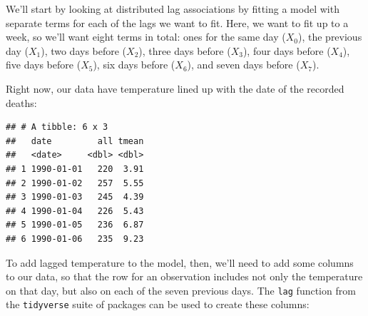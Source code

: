 \documentclass[
]{book}
\newenvironment{Shaded}{\begin{snugshade}}{\end{snugshade}}
\newcommand{\DataTypeTok}[1]{\textcolor[rgb]{0.13,0.29,0.53}{#1}}
\newcommand{\DecValTok}[1]{\textcolor[rgb]{0.00,0.00,0.81}{#1}}
\newcommand{\KeywordTok}[1]{\textcolor[rgb]{0.13,0.29,0.53}{\textbf{#1}}}
\newcommand{\NormalTok}[1]{#1}
\newcommand{\OperatorTok}[1]{\textcolor[rgb]{0.81,0.36,0.00}{\textbf{#1}}}
\newcommand{\StringTok}[1]{\textcolor[rgb]{0.31,0.60,0.02}{#1}}
\begin{document}
We'll start by looking at distributed lag associations by fitting a model with
separate terms for each of the lags we want to fit. Here, we want to fit up to
a week, so we'll want eight terms in total: ones for the same day (\(X_0\)), the
previous day (\(X_1\)), two days before (\(X_2\)), three days before (\(X_3\)),
four days before (\(X_4\)), five days before (\(X_5\)), six days before (\(X_6\)),
and seven days before (\(X_7\)).

Right now, our data have temperature lined up with the date of the recorded deaths:

\begin{Shaded}
\end{Shaded}

\begin{verbatim}
## # A tibble: 6 x 3
##   date         all tmean
##   <date>     <dbl> <dbl>
## 1 1990-01-01   220  3.91
## 2 1990-01-02   257  5.55
## 3 1990-01-03   245  4.39
## 4 1990-01-04   226  5.43
## 5 1990-01-05   236  6.87
## 6 1990-01-06   235  9.23
\end{verbatim}

To add lagged temperature to the model, then, we'll need to add some columns to our
data, so that the row for an observation includes not only the temperature on that
day, but also on each of the seven previous days. The \texttt{lag} function from the \texttt{tidyverse}
suite of packages can be used to create these columns:

\begin{Shaded}
\end{Shaded}
\end{document}
